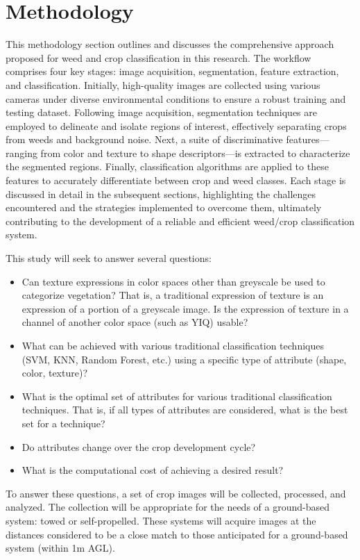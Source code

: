 \documentclass[letterpaper, notitlepage]{report}
\begin{document}
\chapter{Methodology}
\label{section:methodology}
This methodology section outlines and discusses the comprehensive approach proposed for weed and crop classification in this research. The workflow comprises four key stages: image acquisition, segmentation, feature extraction, and classification. Initially, high-quality images are collected using various cameras under diverse environmental conditions to ensure a robust training and testing dataset. Following image acquisition, segmentation techniques are employed to delineate and isolate regions of interest, effectively separating crops from weeds and background noise. Next, a suite of discriminative features—ranging from color and texture to shape descriptors—is extracted to characterize the segmented regions. Finally,  classification algorithms are applied to these features to accurately differentiate between crop and weed classes. Each stage is discussed in detail in the subsequent sections, highlighting the challenges encountered and the strategies implemented to overcome them, ultimately contributing to the development of a reliable and efficient weed/crop classification system.

This study will seek to answer several questions:
\begin{itemize}
	\item{Can texture expressions in color spaces other than greyscale be used to categorize vegetation? That is, a traditional expression of texture is an expression of a portion of a greyscale image. Is the expression of texture in a channel of another color space (such as YIQ) usable?}
	\item{What can be achieved with various traditional classification techniques (SVM, KNN, Random Forest, etc.) using a specific type of attribute (shape, color, texture)?}
	\item{What is the optimal set of attributes for various traditional classification techniques. That is, if all types of attributes are considered, what is the best set for a technique?}
	\item{Do attributes change over the crop development cycle?}
	\item{What is the computational cost of achieving a desired result?}
\end{itemize}

To answer these questions, a set of crop images will be collected, processed, and analyzed. The collection will be appropriate for the needs of a ground-based system: towed or self-propelled. These systems will acquire images at the distances considered to be a close match to those anticipated for a ground-based system (within 1m \gls{AGL}).
\end{document}
